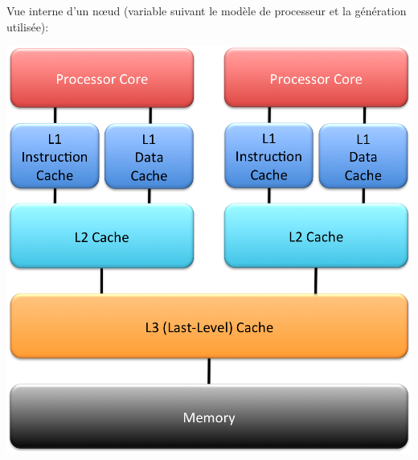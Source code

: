 \documentclass{beamer}
\begin{document}
\begin{frame}
Vue interne d'un n\oe ud (variable suivant le mod\`ele de processeur et la g\'en\'eration utilis\'ee):

\begin{center}
\includegraphics[scale=0.3]{../Images/architecture2}
\end{center}

\end{frame}
\end{document}
